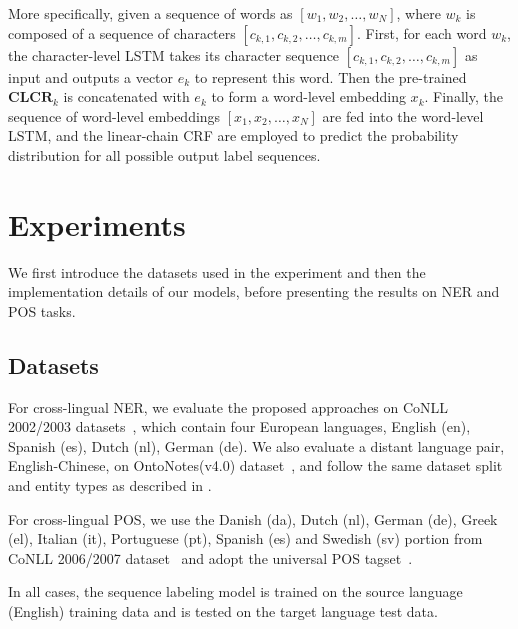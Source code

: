 \documentclass[11pt,a4paper]{article}
\begin{document}
	More specifically, given a sequence of words as $[w_1, w_2, \ldots, w_N]$, where $w_k$ is composed of a sequence of characters $[c_{k,1}, c_{k,2}, \ldots, c_{k,m}]$. First, for each word $w_k$, the character-level LSTM takes its character sequence $[c_{k,1}, c_{k,2}, \ldots, c_{k,m}]$ as input and outputs a vector $e_k$ to represent this word. Then the pre-trained $\textbf{CLCR}_k$ is concatenated with $e_k$ to form a word-level embedding $x_k$. Finally, the sequence of word-level embeddings $[x_1, x_2, \ldots, x_N]$ are fed into the word-level LSTM, and the linear-chain CRF are employed to predict the probability distribution for all possible output label sequences.
	
	
	\section{Experiments}

	We first introduce the datasets used in the experiment and
	then the implementation details of our models, before presenting the results on NER and POS tasks. 

	\subsection{Datasets} 
	For cross-lingual NER, we evaluate the proposed approaches on CoNLL 2002/2003 datasets~\cite{tksintro2002conll,tjongkimsang2003conll}, which contain four European languages, English (en), Spanish (es), Dutch (nl), German (de). We also evaluate a distant language pair, English-Chinese, on OntoNotes(v4.0) dataset~\cite{hovy2006ontonotes}, and follow the same dataset split and entity types as described in \cite{wang14cross}.
	
	For cross-lingual POS, we use the Danish (da), Dutch (nl), German (de), Greek (el), Italian (it), Portuguese (pt), Spanish (es) and Swedish (sv) portion from CoNLL 2006/2007 dataset~\cite{buchholz2006conll,nivre07the} and adopt the universal POS tagset~\cite{petrov11auniversal}.
	
	In all cases, the sequence labeling model is trained on the source language (English) training data and is tested on the target language test data.
	
\end{document}
